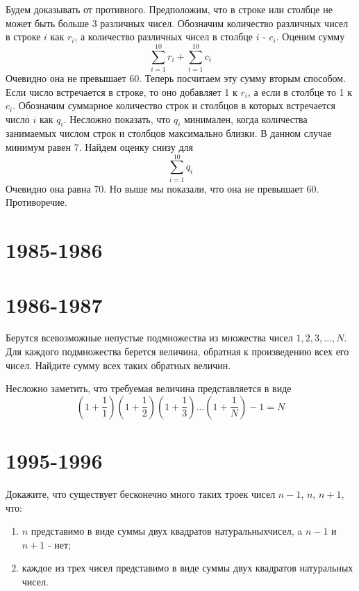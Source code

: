 \documentclass[11pt, a4paper]{template}
\begin{document}
\begin{solution}
Будем доказывать от противного. Предположим, что в строке или столбце не может быть больше 3 различных чисел. Обозначим количество различных чисел в строке $i$ как $r_{i}$, а количество различных чисел в столбце $i$ - $c_{i}$. Оценим сумму
$$
\sum_{i = 1}^{10} r_{i} + \sum_{i = 1}^{10} c_{i} 
$$
Очевидно она не превышает 60. Теперь посчитаем эту сумму вторым способом. Если число встречается в строке, то оно добавляет 1 к $r_{i}$, а если в столбце то 1 к $c_{i}$. Обозначим суммарное количество строк и столбцов в которых встречается число $i$ как $q_{i}$. Несложно показать, что $q_{i}$ минимален, когда количества занимаемых числом строк и столбцов максимально близки. В данном случае минимум равен 7. Найдем оценку снизу для
$$
\sum_{i = 1}^{10} q_{i}
$$
Очевидно она равна 70. Но выше мы показали, что она не превышает 60. Противоречие.
\end{solution}

\chapter{1985-1986}

\chapter{1986-1987}

\begin{exercise}
Берутся всевозможные непустые подмножества из множества чисел $1, 2, 3, \dots, N$. Для каждого подмножества берется величина, обратная к произведению всех его чисел. Найдите сумму всех таких обратных величин.
\end{exercise}

\begin{solution}
Несложно заметить, что требуемая величина представляется в виде
$$
\left(1 + \frac{1}{1}\right)\left(1 + \frac{1}{2}\right)\left(1 + \frac{1}{3}\right)\dots \left(1 + \frac{1}{N}\right) - 1 = N
$$
\end{solution}

\chapter{1995-1996}

\begin{exercise}
Докажите, что существует бесконечно много таких троек чисел $n-1$, $n$, $n+1$, что:
\begin{enumerate}
\item $n$ представимо в виде суммы двух квадратов натуральныхчисел, a $n - 1$ и $n + 1$ - нет;
\item каждое из трех чисел представимо в виде суммы двух квадратов натуральных чисел.
\end{enumerate}
\end{exercise}
\end{document}
